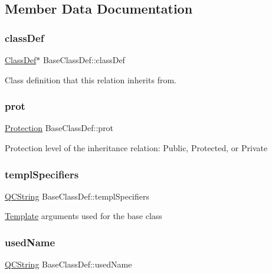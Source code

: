 \subsection{Member Data Documentation}
\mbox{\label{struct_base_class_def_a2a62f0f7057f4cd514f3d1417191ff26}} 
\subsubsection{\texorpdfstring{classDef}{classDef}}
{\footnotesize\ttfamily \mbox{\hyperlink{class_class_def}{Class\+Def}}$\ast$ Base\+Class\+Def\+::class\+Def}

Class definition that this relation inherits from. \mbox{\label{struct_base_class_def_ab5a986f56300bfa53f7c4cff58196294}} 
\subsubsection{\texorpdfstring{prot}{prot}}
{\footnotesize\ttfamily \mbox{\hyperlink{types_8h_a90e352184df58cd09455fe9996cd4ded}{Protection}} Base\+Class\+Def\+::prot}

Protection level of the inheritance relation\+: Public, Protected, or Private \mbox{\label{struct_base_class_def_a2b8a712d468d70c6c80b5c07f49711ae}} 
\subsubsection{\texorpdfstring{templSpecifiers}{templSpecifiers}}
{\footnotesize\ttfamily \mbox{\hyperlink{class_q_c_string}{Q\+C\+String}} Base\+Class\+Def\+::templ\+Specifiers}

\mbox{\hyperlink{class_template}{Template}} arguments used for the base class \mbox{\label{struct_base_class_def_ae7703a5a743ee3b6c066d8037fc71f4e}} 
\subsubsection{\texorpdfstring{usedName}{usedName}}
{\footnotesize\ttfamily \mbox{\hyperlink{class_q_c_string}{Q\+C\+String}} Base\+Class\+Def\+::used\+Name}

